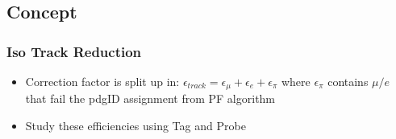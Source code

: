\documentclass{beamer}
\begin{document}
\subsection{Concept}
\begin{frame}
\frametitle{Iso Track Reduction}
 \begin{center}
 \end{center}
 \begin{itemize}
  \item Correction factor is split up in: $\epsilon_{track} = \epsilon_{\mu} +\epsilon_{e} +\epsilon_{\pi} $ where $\epsilon_{\pi}$ contains $\mu/e$ that fail the pdgID assignment from PF algorithm
  \item Study these efficiencies using Tag and Probe
 \end{itemize}
\end{frame}
\end{document}
